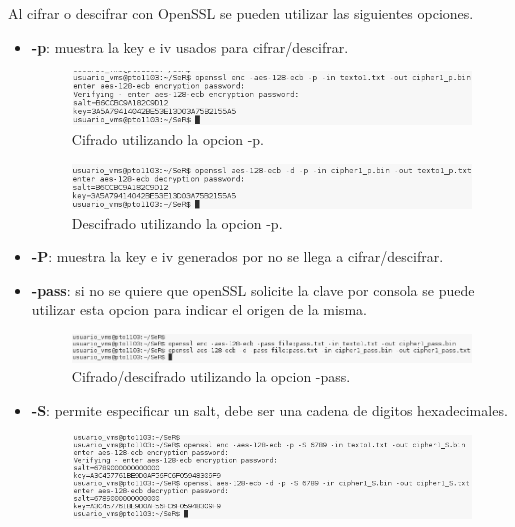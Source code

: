 \documentclass[11pt]{article}
\begin{document}
      \par
      Al cifrar o descifrar con OpenSSL se pueden utilizar las siguientes opciones.
      \begin{itemize}
        \item \textbf{-p}: muestra la key e iv usados para cifrar/descifrar.
              \begin{figure}[!h]
                \centering
                \includegraphics[width = .9\textwidth]{cipher_p}
                \caption{Cifrado utilizando la opcion -p.}
              \end{figure}
              \begin{figure}[!h]
                \centering
                \includegraphics[width = .9\textwidth]{dcipher_p}
                \caption{Descifrado utilizando la opcion -p.}
              \end{figure}
        \item \textbf{-P}: muestra la key e iv generados por no se llega a cifrar/descifrar.
        \item \textbf{-pass}: si no se quiere que openSSL solicite la clave por consola se puede utilizar esta opcion para indicar el origen de la misma.
              \begin{figure}[!h]
                \centering
                \includegraphics[width = .9\textwidth]{cipher_pass}
                \caption{Cifrado/descifrado utilizando la opcion -pass.}
              \end{figure}
        \item \textbf{-S}: permite especificar un salt, debe ser una cadena de digitos hexadecimales.
              \begin{figure}[!h]
                \centering
                \includegraphics[width = .9\textwidth]{cipher_S}

\end{figure}
\end{itemize}
\end{document}
